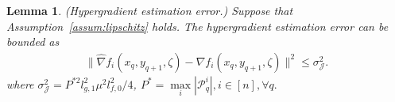 \documentclass[lettersize,journal]{IEEEtran}
\newtheorem{lemma}{Lemma}
\begin{document}
\begin{lemma}\label{hyper-gradient estimation}
(Hypergradient estimation error.) Suppose that Assumption~\ref{assum:lipschitz} holds. The hypergradient estimation error can be bounded as 
\begin{align}
    \|\hat{\nabla} f_i(x_q,y_{q+1},\zeta)- \nabla f_i(x_q,y_{q+1},\zeta)\|^2\leq \sigma_{\mathcal{J}}^2.
\end{align}
where $\sigma_{\mathcal{J}}^2 = P^{*2}l_{g,1}^2\mu^2l_{f,0}^2/4$, $P^*=\max\limits_{i}|\mathcal{P}_q^i|,i\in[n], \forall q.$
\end{lemma}
\end{document}
